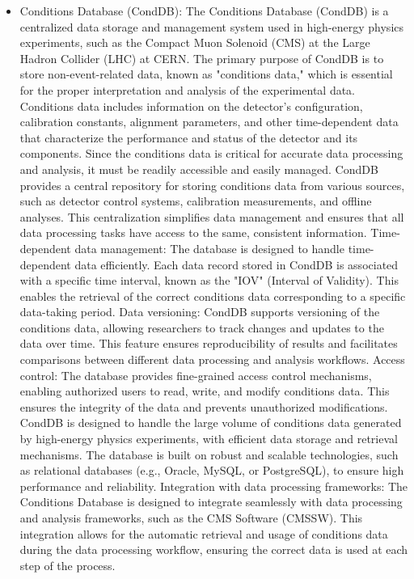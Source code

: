 \begin{itemize}
\item Conditions Database (CondDB): The Conditions Database (CondDB) is a centralized data storage and management system used in high-energy physics experiments, such as the Compact Muon Solenoid (CMS) at the Large Hadron Collider (LHC) at CERN. The primary purpose of CondDB is to store non-event-related data, known as "conditions data," which is essential for the proper interpretation and analysis of the experimental data. Conditions data includes information on the detector's configuration, calibration constants, alignment parameters, and other time-dependent data that characterize the performance and status of the detector and its components. Since the conditions data is critical for accurate data processing and analysis, it must be readily accessible and easily managed. CondDB provides a central repository for storing conditions data from various sources, such as detector control systems, calibration measurements, and offline analyses. This centralization simplifies data management and ensures that all data processing tasks have access to the same, consistent information. Time-dependent data management: The database is designed to handle time-dependent data efficiently. Each data record stored in CondDB is associated with a specific time interval, known as the "IOV" (Interval of Validity). This enables the retrieval of the correct conditions data corresponding to a specific data-taking period. Data versioning: CondDB supports versioning of the conditions data, allowing researchers to track changes and updates to the data over time. This feature ensures reproducibility of results and facilitates comparisons between different data processing and analysis workflows. Access control: The database provides fine-grained access control mechanisms, enabling authorized users to read, write, and modify conditions data. This ensures the integrity of the data and prevents unauthorized modifications. CondDB is designed to handle the large volume of conditions data generated by high-energy physics experiments, with efficient data storage and retrieval mechanisms. The database is built on robust and scalable technologies, such as relational databases (e.g., Oracle, MySQL, or PostgreSQL), to ensure high performance and reliability. Integration with data processing frameworks: The Conditions Database is designed to integrate seamlessly with data processing and analysis frameworks, such as the CMS Software (CMSSW). This integration allows for the automatic retrieval and usage of conditions data during the data processing workflow, ensuring the correct data is used at each step of the process.


\end{itemize}
